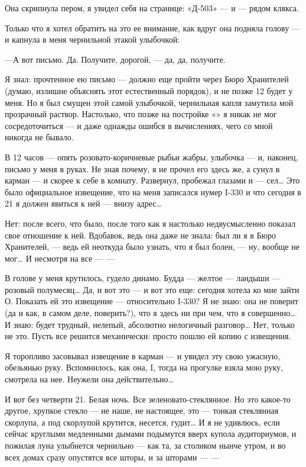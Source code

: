 \documentclass[11pt,openany]{book}
\begin{document}
Она скрипнула пером, я увидел себя на странице: «Д-503» --- и --- рядом клякса.

Только что я хотел обратить на это ее внимание, как вдруг она подняла голову --- и капнула в меня чернильной этакой улыбочкой:

---А вот письмо. Да. Получите, дорогой, --- да, да, получите.

Я знал: прочтенное ею письмо --- должно еще пройти через Бюро Хранителей (думаю, излишне объяснять этот естественный порядок), и не позже 12 будет у меня. Но я был смущен этой самой улыбочкой, чернильная капля замутила мой прозрачный раствор. Настолько, что позже на постройке «» я никак не мог сосредоточиться --- и даже однажды ошибся в вычислениях, чего со мной никогда не бывало.

В 12 часов --- опять розовато-коричневые рыбьи жабры, улыбочка --- и, наконец, письмо у меня в руках. Не зная почему, я не прочел его здесь же, а сунул в карман --- и скорее к себе в комнату. Развернул, пробежал глазами и --- сел\ldots{} Это было официальное извещение, что на меня записался нумер I-330 и что сегодня в 21 я должен явиться к ней --- внизу адрес\ldots{}

Нет: после всего, что было, после того как я настолько недвусмысленно показал свое отношение к ней. Вдобавок, ведь она даже не знала: был ли я в Бюро Хранителей, --- ведь ей неоткуда было узнать, что я был болен, --- ну, вообще не мог\ldots{} И несмотря на все --- ---

В голове у меня крутилось, гудело динамо. Будда --- желтое --- ландыши --- розовый полумесяц\ldots{} Да, и вот это --- и вот это еще: сегодня хотела ко мне зайти О. Показать ей это извещение --- относительно I-330? Я не знаю: она не поверит (да и как, в самом деле, поверить?), что я здесь ни при чем, что я совершенно\ldots{} И знаю: будет трудный, нелепый, абсолютно нелогичный разговор\ldots{} Нет, только не это. Пусть все решится механически: просто пошлю ей копию с извещения.

Я торопливо засовывал извещение в карман --- и увидел эту свою ужасную, обезьянью руку. Вспомнилось, как она, I, тогда на прогулке взяла мою руку, смотрела на нее. Неужели она действительно\ldots{}

И вот без четверти 21. Белая ночь. Все зеленовато-стеклянное. Но это какое-то другое, хрупкое стекло --- не наше, не настоящее, это --- тонкая стеклянная скорлупа, а под скорлупой крутится, несется, гудит\ldots{} И я не удивлюсь, если сейчас круглыми медленными дымами подымутся вверх купола аудиториумов, и пожилая луна улыбнется чернильно --- как та, за столиком нынче утром, и во всех домах сразу опустятся все шторы, и за шторами --- ---
\end{document}

